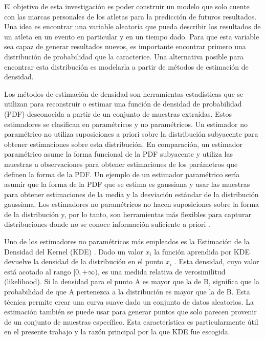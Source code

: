 El objetivo de esta investigación es poder construir un modelo que solo cuente con las marcas personales de los atletas para la predicción de futuros resultados. Una idea es encontrar una variable aleatoria que pueda describir los resultados de un atleta en un evento en particular y en un tiempo dado. Para que esta variable sea capaz de generar resultados nuevos, es importante encontrar primero una distribución de probabilidad que la caracterice. Una alternativa posible para encontrar esta distribución es modelarla a partir de métodos de estimación de densidad.

Los métodos de estimación de densidad son herramientas estadísticas que se utilizan para reconstruir o estimar una función de densidad de probabilidad (PDF) desconocida a partir de un conjunto de muestras extraídas. Estos estimadores se clasifican en paramétricos y no paramétricos. Un estimador no paramétrico no utiliza suposiciones a priori sobre la distribución subyacente para obtener estimaciones sobre esta distribución. En comparación, un estimador paramétrico asume la forma funcional de la PDF subyacente y utiliza las muestras u observaciones para obtener estimaciones de los parámetros que definen la forma de la PDF. Un ejemplo de un estimador paramétrico sería asumir que la forma de la PDF que se estima es gaussiana y usar las muestras para obtener estimaciones de la media y la desviación estándar de la distribución gaussiana. Los estimadores no paramétricos no hacen suposiciones sobre la forma de la distribución y, por lo tanto, son herramientas más flexibles para capturar distribuciones donde no se conoce información suficiente a priori \cite{burke2016kernel}.

Uno de los estimadores no paramétricos más empleados es la Estimación de la Densidad del Kernel (KDE) \cite{rosenblatt1956remarks}. Dado un valor  $x_i$  la función aprendida por KDE devuelve la densidad de la distribución en el punto  $x_i$ . Esta densidad, cuyo valor está acotado al rango $[0, + \infty )$, es una medida relativa de verosimilitud (likelihood). Si la densidad para el punto A es mayor que la de B, significa que la probabilidad de que A pertenezca a la distribución es mayor que la de B. Esta técnica permite crear una curva suave dado un conjunto de datos aleatorios. La estimación también se puede usar para generar puntos que solo parecen provenir de un conjunto de muestras específico. Esta característica es particularmente útil en el presente trabajo y la razón principal por la que KDE fue escogida.

